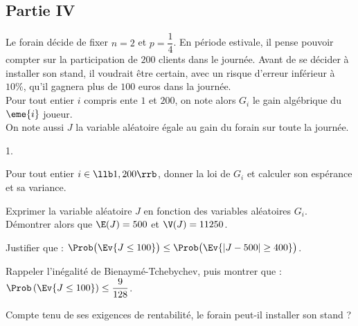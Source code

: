 \newpage


\subsection*{Partie IV}

\noindent
Le forain décide de fixer $n = 2$ et $p = \dfrac{1}{4}$. En période
estivale, il pense pouvoir compter sur la participation de $200$
clients dans le journée. Avant de se décider à installer son stand, il
voudrait être certain, avec un risque d'erreur inférieur à $10 \%$,
qu'il gagnera plus de $100$ euros dans la journée.\\
Pour tout entier $i$ compris ente $1$ et $200$, on note alors $G_{i}$
le gain algébrique du $\eme{i}$ joueur.\\
On note aussi $J$ la variable aléatoire égale au gain du forain sur
toute la journée.
\begin{noliste}{1.}
  \setlength{\itemsep}{4mm}
\item Pour tout entier $i \in \llb 1,200 \rrb$, donner la loi de
  $G_{i}$ et calculer son espérance et sa variance.
  
  

\item Exprimer la variable aléatoire $J$ en fonction des variables
  aléatoires $G_{i}$.\\
  Démontrer alors que $\E(J) = 500$ et $\V(J) = 11250$.

  

\item Justifier que : $\Prob\big(\Ev{ J \leq 100}\big) \leq \Prob\big(
  \Ev{|J-500|\geq 400} \big)$.

  

\item Rappeler l'inégalité de Bienaymé-Tchebychev, puis montrer que :
  $\Prob\left(\Ev{J \leq 100}\right) \leq \dfrac{9}{128}$.

  

\item Compte tenu de ses exigences de rentabilité, le forain peut-il
  installer son stand ?

  
\end{noliste}
